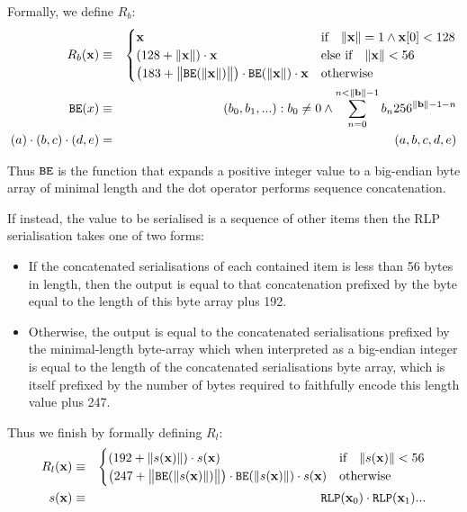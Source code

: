 \documentclass[9pt,oneside]{amsart}
\begin{document}
Formally, we define $R_b$:
\begin{eqnarray}
R_b(\mathbf{x}) & \equiv & \begin{cases}
\mathbf{x} & \text{if} \quad \lVert \mathbf{x} \rVert = 1 \wedge \mathbf{x}[0] < 128 \\
(128 + \lVert \mathbf{x} \rVert) \cdot \mathbf{x} & \text{else if} \quad \lVert \mathbf{x} \rVert < 56 \\
\big(183 + \big\lVert \mathtt{\tiny BE}(\lVert \mathbf{x} \rVert) \big\rVert \big) \cdot \mathtt{\tiny BE}(\lVert \mathbf{x} \rVert) \cdot \mathbf{x} & \text{otherwise}
\end{cases} \\
\mathtt{\tiny BE}(x) & \equiv & (b_0, b_1, ...): b_0 \neq 0 \wedge \sum_{n = 0}^{n < \lVert \mathbf{b} \rVert - 1} b_n256^{\lVert \mathbf{b} \rVert - 1 - n} \\
(a) \cdot (b, c) \cdot (d, e) & = & (a, b, c, d, e)
\end{eqnarray}

Thus $\mathtt{\tiny BE}$ is the function that expands a positive integer value to a big-endian byte array of minimal length and the dot operator performs sequence concatenation.

If instead, the value to be serialised is a sequence of other items then the RLP serialisation takes one of two forms:

\begin{itemize}
\item If the concatenated serialisations of each contained item is less than 56 bytes in length, then the output is equal to that concatenation prefixed by the byte equal to the length of this byte array plus 192.
\item Otherwise, the output is equal to the concatenated serialisations prefixed by the minimal-length byte-array which when interpreted as a big-endian integer is equal to the length of the concatenated serialisations byte array, which is itself prefixed by the number of bytes required to faithfully encode this length value plus 247.
\end{itemize}

Thus we finish by formally defining $R_l$:
\begin{eqnarray}
R_l(\mathbf{x}) & \equiv & \begin{cases}
(192 + \lVert s(\mathbf{x}) \rVert) \cdot s(\mathbf{x}) & \text{if} \quad \lVert s(\mathbf{x}) \rVert < 56 \\
\big(247 + \big\lVert \mathtt{\tiny BE}(\lVert s(\mathbf{x}) \rVert) \big\rVert \big) \cdot \mathtt{\tiny BE}(\lVert s(\mathbf{x}) \rVert) \cdot s(\mathbf{x}) & \text{otherwise}
\end{cases} \\
s(\mathbf{x}) & \equiv & \mathtt{\tiny RLP}(\mathbf{x}_0) \cdot \mathtt{\tiny RLP}(\mathbf{x}_1) ...
\end{eqnarray}
\end{document}
